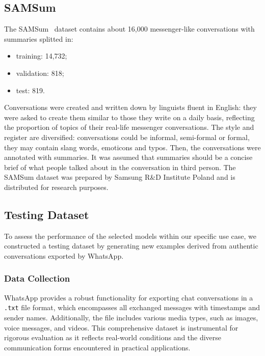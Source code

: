 \documentclass[10pt,twocolumn,letterpaper]{article}
\begin{document}
\subsection{SAMSum}

The SAMSum~\cite{DBLP:journals/corr/abs-1911-12237} dataset contains about 16,000 messenger-like conversations with summaries splitted in:
\begin{itemize}
    \item training: 14,732;
    \item validation: 818;
    \item test: 819.
\end{itemize}
Conversations were created and written down by linguists fluent in English: they were asked to create them similar to those they write on a daily basis, reflecting the proportion of topics of their real-life messenger conversations. 
The style and register are diversified: conversations could be informal, semi-formal or formal, 
they may contain slang words, emoticons and typos. Then, the conversations were annotated with summaries. 
It was assumed that summaries should be a concise brief of what people talked about in the conversation in third person. 
The SAMSum dataset was prepared by Samsung R\&D Institute Poland and is distributed for research purposes.

\subsection{Testing Dataset}

To assess the performance of the selected models within our specific use case, we constructed a testing dataset by generating new examples derived from authentic conversations exported by WhatsApp.

\subsubsection{Data Collection}

\hspace{1em}WhatsApp provides a robust functionality for exporting chat conversations in a \texttt{.txt} file format, which encompasses all exchanged messages with timestamps and sender names. 
Additionally, the file includes various media types, such as images, voice messages, and videos. 
This comprehensive dataset is instrumental for rigorous evaluation as it reflects real-world conditions and the diverse communication forms encountered in practical applications.
\end{document}
